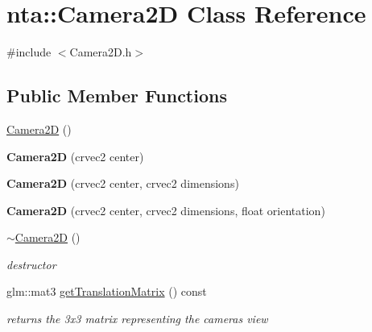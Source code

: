 \hypertarget{classnta_1_1Camera2D}{}\section{nta\+:\+:Camera2D Class Reference}
\label{classnta_1_1Camera2D}


{\ttfamily \#include $<$Camera2\+D.\+h$>$}

\subsection*{Public Member Functions}
\begin{DoxyCompactItemize}
\item 
\hyperlink{classnta_1_1Camera2D_a11aada3f997c594ade11dd3c46d826f4}{Camera2D} ()
\item 
\mbox{\label{classnta_1_1Camera2D_a69171de8322165de5f134a83e33c419a}} 
{\bfseries Camera2D} (crvec2 center)
\item 
\mbox{\label{classnta_1_1Camera2D_af503a21cf73859010aefbacb1af7078c}} 
{\bfseries Camera2D} (crvec2 center, crvec2 dimensions)
\item 
\mbox{\label{classnta_1_1Camera2D_a455d4862168f1dc4fe81040d6fcc80d2}} 
{\bfseries Camera2D} (crvec2 center, crvec2 dimensions, float orientation)
\item 
\mbox{\label{classnta_1_1Camera2D_a18046ff230e055a06c6ca750e6eea8de}} 
\hyperlink{classnta_1_1Camera2D_a18046ff230e055a06c6ca750e6eea8de}{$\sim$\+Camera2D} ()
\begin{DoxyCompactList}\small\item\em destructor \end{DoxyCompactList}\item 
\mbox{\label{classnta_1_1Camera2D_a5bbd89d9119dcd820e60756b816ad0b3}} 
glm\+::mat3 \hyperlink{classnta_1_1Camera2D_a5bbd89d9119dcd820e60756b816ad0b3}{get\+Translation\+Matrix} () const
\begin{DoxyCompactList}\small\item\em returns the 3x3 matrix representing the camera\textquotesingle{}s view \end{DoxyCompactList}\item 

\end{DoxyCompactItemize}
